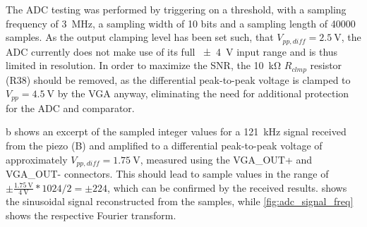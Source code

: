 \documentclass[
	english,
	ruledheaders=section, %
	class=report,%
	thesis={type=Project Seminar Report},%
	accentcolor=TUDa-1d, %
	custommargins=false,%
	marginpar=false,%
	parskip=half-,%
	fontsize=11pt,%
]{tudapub}
\begin{document}
The \gls{ADC} testing was performed by triggering on a threshold, with a sampling frequency of \SI{3}{\mega\hertz}, a sampling width of 10 bits and a sampling length of 40000 samples.
As the output clamping level has been set such, that $V_{pp,diff} = \SI{2.5}{\volt}$, the \gls{ADC} currently does not make use of its full \SI{\pm4}{\volt} input range and is thus limited in resolution. In order to maximize the \gls{SNR}, the \SI{10}{\kilo\ohm} $R_{clmp}$ resistor (R38) should be removed, as the differential peak-to-peak voltage is clamped to $V_{pp}=\SI{4.5}{\volt}$ by the \gls{VGA} anyway, eliminating the need for additional protection for the \gls{ADC} and comparator.

b shows an excerpt of the sampled integer values for a \SI{121}{\kilo\hertz} signal received from the piezo (B) and amplified to a differential peak-to-peak voltage of approximately $V_{pp,diff}=\SI{1.75}{\volt}$, measured using the VGA\_OUT+ and VGA\_OUT- connectors.
This should lead to sample values in the range of  $\pm\frac{\SI{1.75}{\volt}}{\SI{4}{\volt}} * 1024 / 2 = \pm224$, which can be confirmed by the received results.  shows the sinusoidal signal reconstructed from the samples, while \cref{fig:adc_signal_freq} shows the respective Fourier transform.
\end{document}
